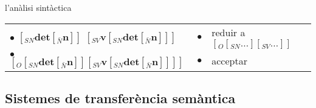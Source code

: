 \begin{persabermes}{l'anàlisi sintàctica}
\begin{center}
\begin{tabular}{l|r|l}
  \\
  $\bullet$ $[_{SN} \textbf{det} [_{\bar{N}} \textbf{n} ] ]$
  $[_{SV} \textbf{v}  [_{SN} \textbf{det} [_{\bar{N}} \textbf{n} ] ] ]$
  & 
  $\bullet$
  & 
  reduir a $[_O [_{SN} \ldots ] [_{SV} \ldots ] ]$
  \\
  $\bullet$ $[_O [_{SN} \textbf{det} [_{\bar{N}} \textbf{n} ] ] [_{SV} \textbf{v}  [_{SN} \textbf{det} [_{\bar{N}} \textbf{n} ]
  ] ] ]$
  & 
  $\bullet$
  & 
  acceptar
  \\
  \hline
  \end{tabular}
\end{center}
\end{persabermes}


\subsection{Sistemes de transferència semàntica}

